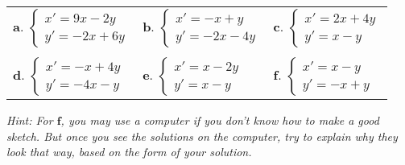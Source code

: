 \documentclass[10pt,psamsfonts,reqno,oneside,letterpaper]{amsart}
\begin{document}
\begin{enumerate}[I]
	\begin{center}
		\begin{tabular}{lll}
			\textbf{a}. $\left \{ \begin{array}{l} x' = 9x - 2y \\ y' = -2x + 6y \end{array} \right. $ &
			\textbf{b}. $\left \{ \begin{array}{l} x' = - x + y  \\ y' = - 2x - 4y \end{array} \right.$ &
			\textbf{c}. $\left \{ \begin{array}{l} x' = 2x + 4y   \\ y' = x - y  \end{array} \right.$ \\ \\
			\textbf{d}. $\left \{ \begin{array}{l} x' = - x + 4y \\ y' = - 4x - y  \end{array} \right.$ &
			\textbf{e}. $\left \{ \begin{array}{l} x' = x - 2y \\ y' = x - y \end{array} \right. $ &
			\textbf{f}. $\left \{ \begin{array}{l} x' = x - y \\ y' = - x + y \end{array} \right. $ 
		\end{tabular}
	\end{center}
	\textit{Hint: For $\textbf{f}$, you may use a computer if you don't know how to make a good sketch.   But once you see the solutions on the computer, try to explain why they look that way, based on the form of your solution.}
	

\end{enumerate}
\end{document}
